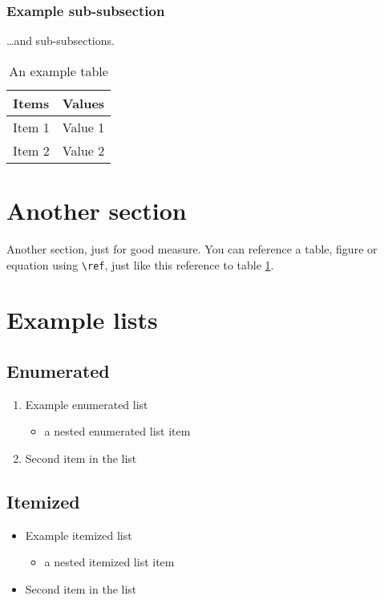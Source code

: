 \documentclass[11pt,openright,twoside,a4paper]{report}
\begin{document}
\subsubsection{Example sub-subsection}
\ldots and sub-subsections.

\begin{table}[htb]
\begin{center}
\caption{An example table}
\label{Example-Table}
\begin{tabular}{|l|l|}
\hline
Items & Values \\
\hline
\hline
Item 1 & Value 1 \\
Item 2 & Value 2 \\
\hline
\end{tabular}
\end{center}
\end{table}

\section[short section title]{Another section}
Another section, just for good measure.
You can reference a table, figure or equation using \verb|\ref|, just
like this reference to table \ref{Example-Table}.

\section{Example lists}

\subsection{Enumerated}

\begin{enumerate}
\item Example enumerated list
  \begin{itemize}
  \item a nested enumerated list item
  \end{itemize}
\item Second item in the list
\end{enumerate}

\subsection{Itemized}

\begin{itemize}
\item Example itemized list
  \begin{itemize}
  \item a nested itemized list item
  \end{itemize}
\item Second item in the list
\end{itemize}
\end{document}
